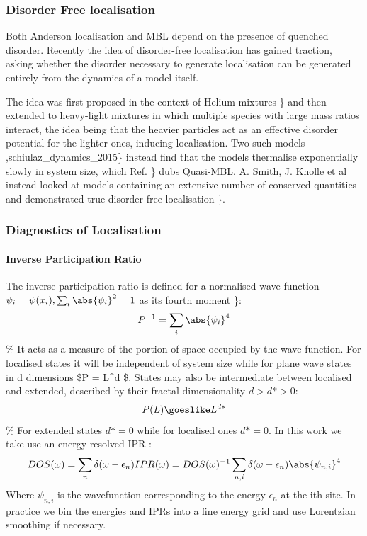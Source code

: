 \hypertarget{disorder-free-localisation}{%
\subsubsection{Disorder Free localisation}\label{disorder-free-localisation}}

Both Anderson localisation and MBL depend on the presence of quenched disorder. Recently the idea of disorder-free localisation has gained traction, asking whether the disorder necessary to generate localisation can be generated entirely from the dynamics of a model itself.

The idea was first proposed in the context of Helium mixtures \textcite{kagan1984localization}\} and then extended to heavy-light mixtures in which multiple species with large mass ratios interact, the idea being that the heavier particles act as an effective disorder potential for the lighter ones, inducing localisation. Two such models \textcite{yao_quasi-many-body_2016},schiulaz\_dynamics\_2015\} instead find that the models thermalise exponentially slowly in system size, which Ref. \textcite{yao_quasi-many-body_2016}\} dubs Quasi-MBL. A. Smith, J. Knolle et al instead looked at models containing an extensive number of conserved quantities and demonstrated true disorder free localisation \textcite{smith_disorder-free_2017}\}.

\hypertarget{diagnostics-of-localisation}{%
\subsubsection{Diagnostics of Localisation}\label{diagnostics-of-localisation}}

\hypertarget{inverse-participation-ratio}{%
\paragraph{Inverse Participation Ratio}\label{inverse-participation-ratio}}

The inverse participation ratio is defined for a normalised wave function \(\psi_i = \psi(x_i), \sum_i \abs{\psi_i}^2 = 1\) as its fourth moment \textcite{kramer_localization_1993}\}: \[
P^{-1} = \sum_i \abs{\psi_i}^4
\] \% It acts as a measure of the portion of space occupied by the wave function. For localised states it will be independent of system size while for plane wave states in d dimensions \$P = L\^{}d \$. States may also be intermediate between localised and extended, described by their fractal dimensionality \(d > d* > 0\): \[
P(L) \goeslike L^{d*} 
\] \% For extended states \(d* = 0\) while for localised ones \(d* = 0\). In this work we take use an energy resolved IPR \textcite{antipov_interaction-tuned_2016-1}: \[
DOS(\omega) = \sum_n \delta(\omega - \epsilon_n)
IPR(\omega) = DOS(\omega)^{-1} \sum_{n,i} \delta(\omega - \epsilon_n) \abs{\psi_{n,i}}^4
\] Where \(\psi_{n,i}\) is the wavefunction corresponding to the energy \(\epsilon_n\) at the ith site. In practice we bin the energies and IPRs into a fine energy grid and use Lorentzian smoothing if necessary.

